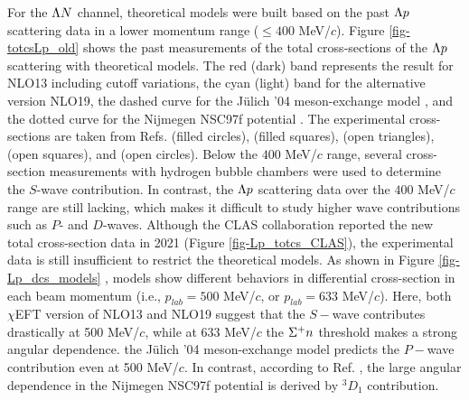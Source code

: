 For the $\Lambda N$ channel, theoretical models were built based on the past $\Lambda p$ scattering data in a lower momentum range ($\leq400$ MeV/$c$). Figure \ref{fig-totcsLp_old} \cite{chiEFT-2020} shows the past measurements of the total cross-sections of the $\Lambda p$ scattering with theoretical models. The red (dark) band represents the result for NLO13 \cite{NLO13} including cutoff variations, the cyan (light) band for the alternative version NLO19, the dashed curve for the J\"{u}lich '04 meson-exchange model \cite{chiEFT-2005}, and the dotted curve for the Nijmegen NSC97f potential \cite{NSC97f}. The experimental cross-sections are taken from Refs. \cite{Lp-1968_Sechi} (filled circles), \cite{Lp-1968_Alex} (filled squares), \cite{Lp-1967_Herndon} (open triangles), \cite{Lp-1971} (open squares), and \cite{Lp-1977_Hauptman} (open circles). Below the $400$ MeV/$c$ range, several cross-section measurements with hydrogen bubble chambers were used to determine the $S$-wave contribution. In contrast, the $\Lambda p$ scattering data over the $400$ MeV/$c$ range are still lacking, which makes it difficult to study higher wave contributions such as $P$- and $D$-waves. Although the CLAS collaboration reported the new total cross-section data \cite{Lp-2021} in 2021 (Figure \ref{fig-Lp_totcs_CLAS}), the experimental data is still insufficient to restrict the theoretical models. As shown in Figure \ref{fig-Lp_dcs_models} \cite{chiEFT-2020}, models show different behaviors in differential cross-section in each beam momentum (i.e., $p_{lab}=500$ MeV/$c$, or $p_{lab}=633$ MeV/$c$). Here, both $\chi$EFT version of NLO13 and NLO19 suggest that the $S-$wave contributes drastically at 500 MeV/$c$, while at 633 MeV/$c$ the $\Sigma^{+}n$ threshold makes a strong angular dependence. the J\"{u}lich '04 meson-exchange model predicts the $P-$wave contribution even at 500 MeV/$c$. In contrast, according to Ref. \cite{OBE-1999}, the large angular dependence in the Nijmegen NSC97f potential is derived by $^3D_1$ contribution. 




